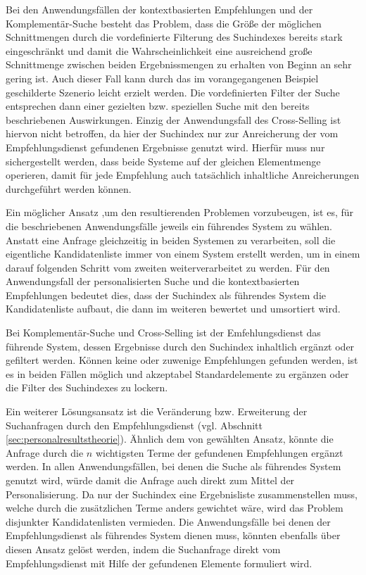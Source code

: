Bei den Anwendungsfällen der kontextbasierten Empfehlungen und der Komplementär-Suche besteht das Problem, dass die Größe der möglichen Schnittmengen durch die vordefinierte Filterung des Suchindexes bereits stark eingeschränkt und damit die Wahrscheinlichkeit eine ausreichend große Schnittmenge zwischen beiden Ergebnissmengen zu erhalten von Beginn an sehr gering ist. Auch dieser Fall kann durch das im vorangegangenen Beispiel geschilderte Szenerio leicht erzielt werden. Die vordefinierten Filter der Suche entsprechen dann einer gezielten bzw. speziellen Suche mit den bereits beschriebenen Auswirkungen. Einzig der Anwendungsfall des Cross-Selling ist hiervon nicht betroffen, da hier der Suchindex nur zur Anreicherung der vom Empfehlungsdienst gefundenen Ergebnisse genutzt wird. Hierfür muss nur sichergestellt werden, dass beide Systeme auf der gleichen Elementmenge operieren, damit für jede Empfehlung auch tatsächlich inhaltliche Anreicherungen durchgeführt werden können.


Ein möglicher Ansatz ,um den resultierenden Problemen vorzubeugen, ist es, für die beschriebenen Anwendungsfälle jeweils ein führendes System zu wählen. Anstatt eine Anfrage gleichzeitig in beiden Systemen zu verarbeiten, soll die eigentliche Kandidatenliste immer von einem System erstellt werden, um in einem darauf folgenden Schritt vom zweiten weiterverarbeitet zu werden. Für den Anwendungsfall der personalisierten Suche und die kontextbasierten Empfehlungen bedeutet dies, dass der Suchindex als führendes System die Kandidatenliste aufbaut, die dann im weiteren bewertet und umsortiert wird.

Bei Komplementär-Suche und Cross-Selling ist der Emfehlungsdienst das führende System, dessen Ergebnisse durch den Suchindex inhaltlich ergänzt oder gefiltert werden. Können keine oder zuwenige Empfehlungen gefunden werden, ist es in beiden Fällen möglich und akzeptabel Standardelemente zu ergänzen oder die Filter des Suchindexes zu lockern.

Ein weiterer Lösungsansatz ist die Veränderung bzw. Erweiterung der Suchanfragen durch den Empfehlungsdienst (vgl. Abschnitt \ref{sec:personalresultstheorie}). Ähnlich dem von \citep{Boughareb11} gewählten Ansatz, könnte die Anfrage durch die  $n$ wichtigsten Terme der gefundenen Empfehlungen ergänzt werden. In allen Anwendungsfällen, bei denen die Suche als führendes System genutzt wird, würde damit die Anfrage auch direkt zum Mittel der Personalisierung. Da nur der Suchindex eine Ergebnisliste zusammenstellen muss, welche durch die zusätzlichen Terme anders gewichtet wäre, wird das Problem disjunkter Kandidatenlisten vermieden. Die Anwendungsfälle bei denen der Empfehlungsdienst als führendes System dienen muss, könnten ebenfalls über diesen Ansatz gelöst werden, indem die Suchanfrage direkt vom Empfehlungsdienst mit Hilfe der gefundenen Elemente formuliert wird. %

